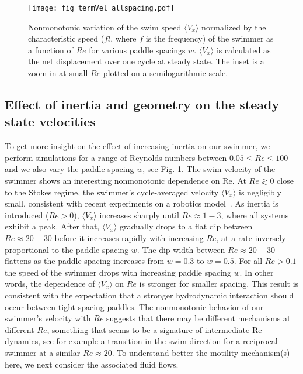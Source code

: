 \documentclass[%
 onecolumn,
superscriptaddress,
 amsmath,amssymb,
 aps,
longbibliography
]{revtex4-2}
\begin{document}
\begin{figure}
\texttt{[image: fig\_termVel\_allspacing.pdf]}
\caption{Nonmonotonic variation of the swim speed $\langle V_x \rangle$ normalized by the characteristic speed ($f l$, where $f$ is the frequency) of the swimmer as a function of $Re$ for various paddle spacings $w$. $\langle V_x \rangle$ is calculated as the net displacement over one cycle at steady state. The inset is a zoom-in at small $Re$ plotted on a semilogarithmic scale.}
\label{fig:avgVvsRe}
\end{figure}


\subsection{Effect of inertia and geometry on the steady state velocities}
To get more insight on the effect of increasing inertia on our swimmer, we perform simulations for a range of Reynolds numbers between $0.05\le Re \le100$ and we also vary the paddle spacing $w$, see Fig. \ref{fig:avgVvsRe}. The swim velocity of the swimmer shows an interesting nonmonotonic dependence on Re. At $Re \gtrsim 0$ close to the Stokes regime, the swimmer's cycle-averaged velocity $\langle V_x \rangle$ is negligibly small, consistent with recent experiments on a robotics model~\cite{Hayashi2020Metachronal}.
As inertia is introduced ($Re > 0$), $\langle V_x \rangle$ increases sharply until $Re \approx 1-3$, where all systems exhibit a peak. After that, $\langle V_x \rangle$ gradually drops to a flat dip between $Re\approx 20 - 30$ before it increases rapidly with increasing $Re$, at a rate inversely proportional to the paddle spacing $w$. The dip width between $Re\approx 20-30$ flattens as the paddle spacing increases from $w = 0.3$ to $w = 0.5$. For all $Re>0.1$ the speed of the swimmer drops with increasing paddle spacing $w$. In other words, the dependence of $\langle V_x \rangle$ on $Re$ is stronger for smaller spacing. This result is consistent with the expectation that a stronger hydrodynamic interaction should occur between tight-spacing paddles.
The nonmonotonic behavior of our swimmer's velocity with $Re$ suggests that there may be different mechanisms at different $Re$, something that seems to be a signature of intermediate-Re dynamics, see for example a transition in the swim direction for a reciprocal swimmer at a similar $Re \approx 20$. To understand better the motility mechanism(s) here, we next consider the associated fluid flows.    
\end{document}
